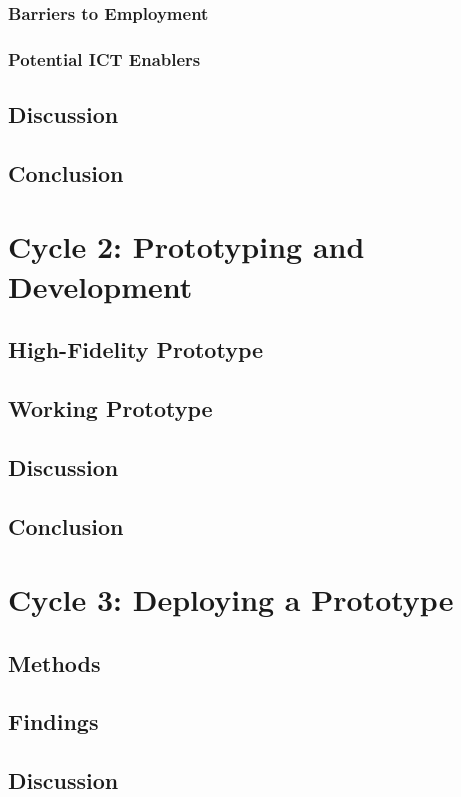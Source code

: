 \documentclass[12pt,a4paper]{report}
\begin{document}
\subsection{Barriers to Employment}
\subsection{Potential ICT Enablers}
\section{Discussion}
\section{Conclusion}

\chapter{Cycle 2: Prototyping and Development}
\section{High-Fidelity Prototype}
\section{Working Prototype}
\section{Discussion}
\section{Conclusion}

\chapter{Cycle 3: Deploying a Prototype}
\section{Methods}
\section{Findings}
\section{Discussion}
\end{document}
